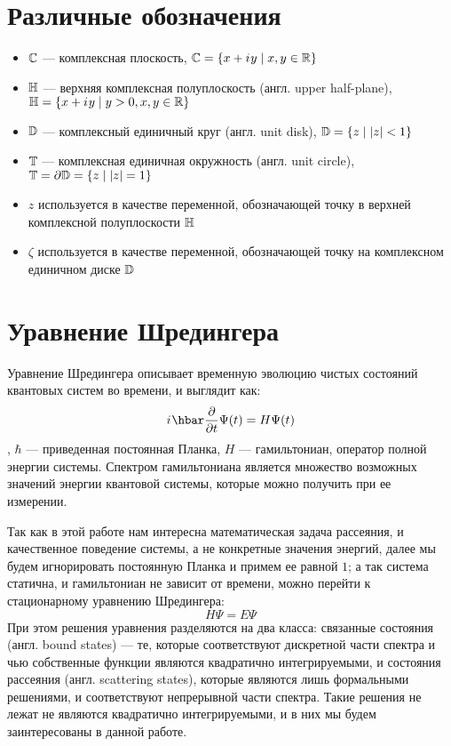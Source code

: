 \section{Различные обозначения}
\begin{itemize}
\item $\mathbb{C}$ — комплексная плоскость, $\mathbb{C} = \{ x + {i\mkern1mu} y \mid x, y \in \mathbb{R} \}$ 
\item $\mathbb{H}$ — верхняя комплексная полуплоскость (англ. upper half-plane), $\mathbb{H} = \{ x + {i\mkern1mu} y \mid y > 0, x, y \in \mathbb{R} \}$
\item $\mathbb{D}$ — комплексный единичный круг (англ. unit disk), $\mathbb{D} = \{ z \mid \abs{z} < 1 \}$
\item $\mathbb{T}$ — комплексная единичная окружность (англ. unit circle), $\mathbb{T} = \partial \mathbb{D} =  \{z \mid \abs{z} = 1 \}$
\item $z$ используется в качестве переменной, обозначающей точку в верхней комплексной полуплоскости $\mathbb{H}$
\item $\zeta$ используется в качестве переменной, обозначающей точку на комплексном единичном диске $\mathbb{D}$
\end{itemize}

\section{Уравнение Шредингера}

Уравнение Шредингера описывает временную эволюцию чистых состояний квантовых систем во времени, и выглядит как:
\[
\iu \hbar \pdv{t} \Psi(t) = H \Psi(t)
\]
, $\hbar$ — приведенная постоянная Планка, $H$ — гамильтониан, оператор полной энергии системы. Спектром гамильтониана является множество возможных значений энергии квантовой системы, которые можно получить при ее измерении.

Так как в этой работе нам интересна математическая задача рассеяния, и качественное поведение системы, а не конкретные значения энергий, далее мы будем игнорировать постоянную Планка и примем ее равной $1$; а так система статична, и гамильтониан не зависит от времени, можно перейти к стационарному уравнению Шредингера:
\[
H \Psi = E \Psi
\]
При этом решения уравнения разделяются на два класса: связанные состояния (англ. bound states) — те, которые соответствуют дискретной части спектра и чью собственные функции являются квадратично интегрируемыми, и состояния рассеяния (англ. scattering states), которые являются лишь формальными решениями, и соответствуют непрерывной части спектра. Такие решения не лежат не являются квадратично интегрируемыми, и в них мы будем заинтересованы в данной работе.


